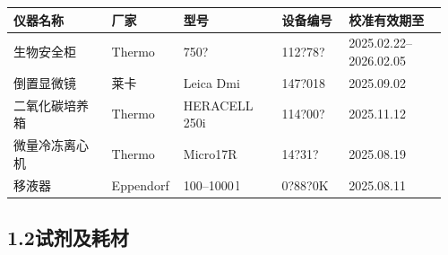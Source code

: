 \documentclass[UTF8,10pt,a4paper,fontset=fandol]{ctexart}
\newcommand{\fieldvalue}[1]{#1}
\newcommand{\handwritten}[1]{#1}
\begin{document}
\begin{center}
\small
\begin{tabular}{|p{0.22\linewidth}|p{0.15\linewidth}|p{0.22\linewidth}|p{0.15\linewidth}|p{0.22\linewidth}|}
\hline
仪器名称 & 厂家 & 型号 & 设备编号 & 校准有效期至 \\ \hline
生物安全柜 & Thermo &
\fieldvalue{\handwritten{750?}} &
\fieldvalue{\handwritten{112?78?}} &
\fieldvalue{\handwritten{2025.02.22--2026.02.05}}
\\ \hline
倒置显微镜 & 莱卡 & Leica Dmi &
\fieldvalue{\handwritten{147?018}} &
\fieldvalue{\handwritten{2025.09.02}}
\\ \hline
二氧化碳培养箱 & Thermo & HERACELL 250i &
\fieldvalue{\handwritten{114?00?}} &
\fieldvalue{\handwritten{2025.11.12}}
\\ \hline
微量冷冻离心机 & Thermo & Micro17R &
\fieldvalue{\handwritten{14?31?}} &
\fieldvalue{\handwritten{2025.08.19}}
\\ \hline
移液器 & Eppendorf &
\fieldvalue{\handwritten{100--1000\,\textmu l}} &
\fieldvalue{\handwritten{0?88?0K}} &
\fieldvalue{\handwritten{2025.08.11}}
\\ \hline
\end{tabular}
\end{center}

\subsection*{1.2\quad 试剂及耗材}
\end{document}
